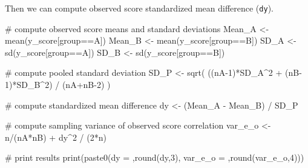 \documentclass[
  letterpaper,
  DIV=11,
  numbers=noendperiod]{scrreprt}
\newenvironment{Shaded}{\begin{snugshade}}{\end{snugshade}}
\newcommand{\CommentTok}[1]{\textcolor[rgb]{0.37,0.37,0.37}{#1}}
\newcommand{\DecValTok}[1]{\textcolor[rgb]{0.68,0.00,0.00}{#1}}
\newcommand{\FunctionTok}[1]{\textcolor[rgb]{0.28,0.35,0.67}{#1}}
\newcommand{\NormalTok}[1]{\textcolor[rgb]{0.00,0.23,0.31}{#1}}
\newcommand{\OtherTok}[1]{\textcolor[rgb]{0.00,0.23,0.31}{#1}}
\newcommand{\SpecialCharTok}[1]{\textcolor[rgb]{0.37,0.37,0.37}{#1}}
\newcommand{\StringTok}[1]{\textcolor[rgb]{0.13,0.47,0.30}{#1}}
\begin{document}
Then we can compute observed score standardized mean difference
(\texttt{dy}).

\begin{Shaded}
\begin{Highlighting}[]
\CommentTok{\# compute observed score means and standard deviations}
\NormalTok{Mean\_A }\OtherTok{\textless{}{-}} \FunctionTok{mean}\NormalTok{(y\_score[group}\SpecialCharTok{==}\StringTok{\textquotesingle{}A\textquotesingle{}}\NormalTok{])}
\NormalTok{Mean\_B }\OtherTok{\textless{}{-}} \FunctionTok{mean}\NormalTok{(y\_score[group}\SpecialCharTok{==}\StringTok{\textquotesingle{}B\textquotesingle{}}\NormalTok{])}
\NormalTok{SD\_A }\OtherTok{\textless{}{-}} \FunctionTok{sd}\NormalTok{(y\_score[group}\SpecialCharTok{==}\StringTok{\textquotesingle{}A\textquotesingle{}}\NormalTok{])}
\NormalTok{SD\_B }\OtherTok{\textless{}{-}} \FunctionTok{sd}\NormalTok{(y\_score[group}\SpecialCharTok{==}\StringTok{\textquotesingle{}B\textquotesingle{}}\NormalTok{])}

\CommentTok{\# compute pooled standard deviation}
\NormalTok{SD\_P }\OtherTok{\textless{}{-}} \FunctionTok{sqrt}\NormalTok{( ((nA}\DecValTok{{-}1}\NormalTok{)}\SpecialCharTok{*}\NormalTok{SD\_A}\SpecialCharTok{\^{}}\DecValTok{2} \SpecialCharTok{+}\NormalTok{ (nB}\DecValTok{{-}1}\NormalTok{)}\SpecialCharTok{*}\NormalTok{SD\_B}\SpecialCharTok{\^{}}\DecValTok{2}\NormalTok{) }\SpecialCharTok{/}\NormalTok{ (nA}\SpecialCharTok{+}\NormalTok{nB}\DecValTok{{-}2}\NormalTok{) )}

\CommentTok{\# compute standardized mean difference}
\NormalTok{dy }\OtherTok{\textless{}{-}}\NormalTok{ (Mean\_A }\SpecialCharTok{{-}}\NormalTok{ Mean\_B) }\SpecialCharTok{/}\NormalTok{ SD\_P}

\CommentTok{\# compute sampling variance of observed score correlation}
\NormalTok{var\_e\_o }\OtherTok{\textless{}{-}}\NormalTok{ n}\SpecialCharTok{/}\NormalTok{(nA}\SpecialCharTok{*}\NormalTok{nB) }\SpecialCharTok{+}\NormalTok{ dy}\SpecialCharTok{\^{}}\DecValTok{2} \SpecialCharTok{/}\NormalTok{ (}\DecValTok{2}\SpecialCharTok{*}\NormalTok{n)}

\CommentTok{\# print results}
\FunctionTok{print}\NormalTok{(}\FunctionTok{paste0}\NormalTok{(}\StringTok{\textquotesingle{}dy = \textquotesingle{}}\NormalTok{,}\FunctionTok{round}\NormalTok{(dy,}\DecValTok{3}\NormalTok{),}\StringTok{\textquotesingle{}  var\_e\_o = \textquotesingle{}}\NormalTok{,}\FunctionTok{round}\NormalTok{(var\_e\_o,}\DecValTok{4}\NormalTok{)))}
\end{Highlighting}
\end{Shaded}
\end{document}
